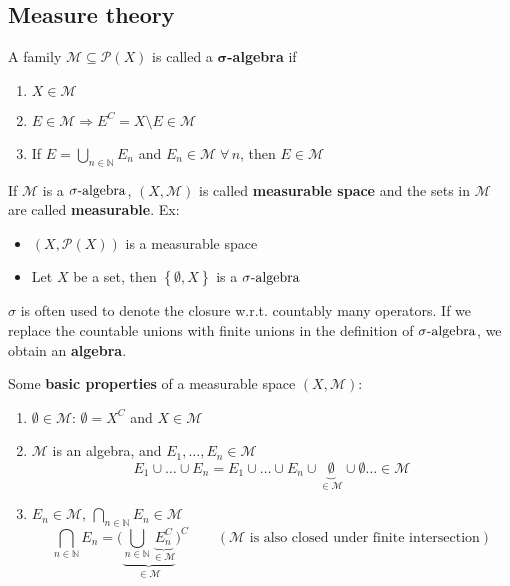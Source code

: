 \subsection*{Measure theory}
\begin{definition}
    A family \(\mathcal{M} \subseteq \mathcal{P}(X)\) is called a \textbf{\(\mathbf{\sigma}\)-algebra} if 
    \begin{enumerate}
        \item \(X \in \mathcal{M}\)
        \item \(E \in \mathcal{M} \Rightarrow E^C = X\setminus E \in \mathcal{M}\)
        \item If \(E = \bigcup_{n \in \mathbb{N}}E_n\) and \(E_n \in \mathcal{M} \; \forall \, n\), then \(E \in \mathcal{M}\)
    \end{enumerate}
\end{definition}
If \(\mathcal{M}\) is a \(\sigma\mbox{-algebra}\), \((X, \mathcal{M})\) is called \textbf{measurable space} and the sets in \(\mathcal{M}\) are called \textbf{measurable}.  
Ex: \begin{itemize}
    \item \((X, \mathcal{P}(X))\) is a measurable space
    \item Let \(X\) be a set, then \(\left\lbrace \emptyset, X \right\rbrace\) is a \(\sigma\mbox{-algebra}\)
\end{itemize}
\begin{remark}
    \(\sigma\) is often used to denote the closure w.r.t. countably many operators. If we replace the countable unions with finite unions in the definition of \(\sigma\mbox{-algebra}\), we obtain an \textbf{algebra}.
\end{remark}
Some \textbf{basic properties} of a measurable space \((X, \mathcal{M})\):
\begin{enumerate}
    \item \(\emptyset \in \mathcal{M}\): \(\emptyset = X^C\) and \(X \in \mathcal{M}\)
    \item \(\mathcal{M}\) is an algebra, and \(E_1, \ldots, E_n \in \mathcal{M}\)
    \[
        E_1 \cup \ldots \cup E_n = E_1 \cup \ldots \cup E_n \cup \underbrace{\emptyset}_{\in \mathcal{M}} \cup \emptyset \ldots \in \mathcal{M} 
    \]
    \item \(E_n \in \mathcal{M}\), \(\bigcap_{n \in \mathbb{N}} E_n \in \mathcal{M}\)
    \[
        \bigcap_{n \in \mathbb{N}} E_n = \biggl(\underbrace{\bigcup_{n \in \mathbb{N}} \underbrace{E_n^C}_{\in \mathcal{M}}}_{\in \mathcal{M}}\biggr)^C \qquad (\mathcal{M} \mbox{ is also closed under finite intersection})
    \]
    \end{enumerate}
